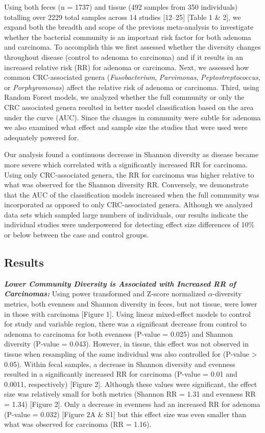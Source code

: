 \documentclass[12pt,]{article}
\begin{document}
Using both feces (n = 1737) and tissue (492 samples from 350
individuals) totalling over 2229 total samples across 14 studies
{[}12--25{]} {[}Table 1 \& 2{]}, we expand both the breadth and scope of
the previous meta-analysis to investigate whether the bacterial
community is an important risk factor for both adenoma and carcinoma. To
accomplish this we first assessed whether the diversity changes
throughout disease (control to adenoma to carcinoma) and if it results
in an increased relative risk (RR) for adenoma or carcinoma. Next, we
assessed how common CRC-associated genera (\emph{Fusobacterium},
\emph{Parvimonas}, \emph{Peptostreptococcus}, or \emph{Porphyromonas})
affect the relative risk of adenoma or carcinoma. Third, using Random
Forest models, we analyzed whether the full community or only the CRC
associated genera resulted in better model classification based on the
area under the curve (AUC). Since the changes in community were subtle
for adenoma we also examined what effect and sample size the studies
that were used were adequately powered for.

Our analysis found a continuous decrease in Shannon diversity as disease
became more severe which correlated with a significantly increased RR
for carcinoma. Using only CRC-associated genera, the RR for carcinoma
was higher relative to what was observed for the Shannon diversity RR.
Conversely, we demonstrate that the AUC of the classification models
increased when the full community was incorporated as opposed to only
CRC-associated genera. Although we analyzed data sets which sampled
large numbers of individuals, our results indicate the individual
studies were underpowered for detecting effect size differences of 10\%
or below between the case and control groups.

\newpage

\subsection{Results}\label{results}

\textbf{\emph{Lower Community Diversity is Associated with Increased RR
of Carcinomas:}} Using power transformed and Z-score normalized
\(\alpha\)-diversity metrics, both evenness and Shannon diversity in
feces, but not tissue, were lower in those with carcinoma {[}Figure
1{]}. Using linear mixed-effect models to control for study and variable
region, there was a significant decrease from control to adenoma to
carcinoma for both evenness (P-value = 0.025) and Shannon diversity
(P-value = 0.043). However, in tissue, this effect was not observed in
tissue when resampling of the same individual was also controlled for
(P-value \textgreater{} 0.05). Within fecal samples, a decrease in
Shannon diversity and evenness resulted in a significantly increased RR
for carcinoma (P-value = 0.01 and 0.0011, respectively) {[}Figure 2{]}.
Although these values were significant, the effect size was relatively
small for both metrics (Shannon RR = 1.31 and evenness RR = 1.34)
{[}Figure 2{]}. Only a decrease in evenness had an increased RR for
adenoma (P-value = 0.032) {[}Figure 2A \& S1{]} but this effect size was
even smaller than what was observed for carcinoma (RR = 1.16).
\end{document}
